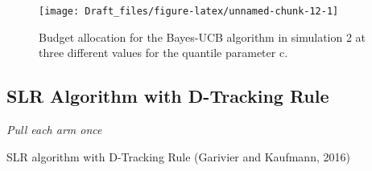 \documentclass[11pt,]{article}
\begin{document}
\begin{figure}

{\centering \texttt{[image: Draft\_files/figure-latex/unnamed-chunk-12-1]} 

}

\caption{Budget allocation for the Bayes-UCB algorithm in simulation 2 at three different values for the quantile parameter c.}\label{fig:unnamed-chunk-12}
\end{figure}

\subsection{SLR Algorithm with D-Tracking
Rule}\label{slr-algorithm-with-d-tracking-rule}

\IncMargin{1em}

\begin{algorithm}
\BlankLine
\emph{Pull each arm once}\;
\caption{SLR algorithm with D-Tracking Rule (Garivier and Kaufmann, 2016)} \label{algo_slr_1d_dTracking}
\end{algorithm}

\DecMargin{1em}
\end{document}
